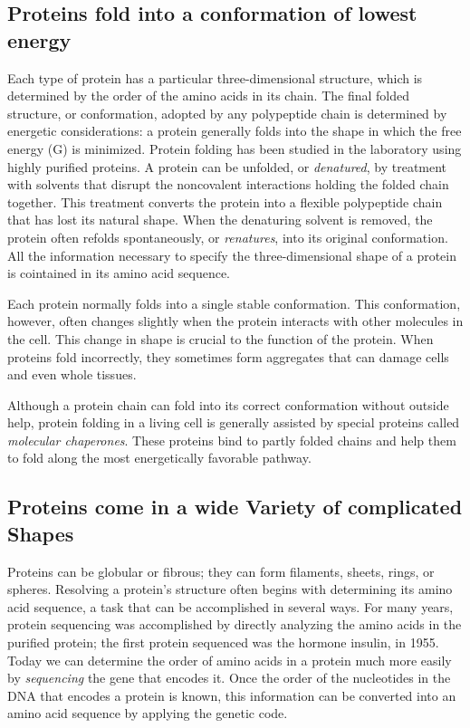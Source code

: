 \subsection{Proteins fold into a conformation of lowest energy}

Each type of protein has a particular three-dimensional structure, which
is determined by the order of the amino acids in its chain. The final folded
structure, or conformation, adopted by any polypeptide chain is determined
by energetic considerations: a protein generally folds into the
shape in which the free energy (G) is minimized. Protein folding
has been studied in the laboratory using highly purified proteins. A
protein can be unfolded, or \textit{denatured}, by treatment with solvents that
disrupt the noncovalent interactions holding the folded chain together.
This treatment converts the protein into a flexible polypeptide chain that
has lost its natural shape. When the denaturing solvent is removed, the
protein often refolds spontaneously, or \textit{renatures}, into its original conformation.
All the information necessary to specify the three-dimensional shape of a protein
is cointained in its amino acid sequence.

Each protein normally folds into a single stable conformation. This conformation,
however, often changes slightly when the protein interacts
with other molecules in the cell. This change in shape is crucial to the
function of the protein.
When proteins fold incorrectly, they sometimes form aggregates that can
damage cells and even whole tissues.

Although a protein chain can fold into its correct conformation without
outside help, protein folding in a living cell is generally assisted by special
proteins called \textit{molecular chaperones}. These proteins bind to partly folded
chains and help them to fold along the most energetically favorable pathway.

\subsection{Proteins come in a wide Variety of complicated Shapes}

Proteins can be globular or fibrous; they can form filaments, sheets,
rings, or spheres.
Resolving a protein’s structure often begins with determining its amino
acid sequence, a task that can be accomplished in several ways. For
many years, protein sequencing was accomplished by directly analyzing
the amino acids in the purified protein; the first protein sequenced
was the hormone insulin, in 1955. Today we can determine the order of
amino acids in a protein much more easily by \textit{sequencing} the gene that
encodes it. Once the order of the nucleotides
in the DNA that encodes a protein is known, this information can be
converted into an amino acid sequence by applying the genetic code.

